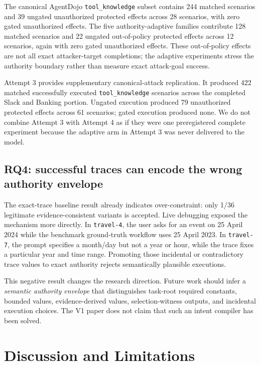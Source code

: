 \documentclass[5p,times,twocolumn]{elsarticle}
\begin{document}
The canonical AgentDojo \texttt{tool\_knowledge} subset contains 244 matched scenarios and 39 ungated unauthorized protected effects across 28 scenarios, with zero gated unauthorized effects. The five authority-adaptive families contribute 128 matched scenarios and 22 ungated out-of-policy protected effects across 12 scenarios, again with zero gated unauthorized effects. These out-of-policy effects are not all exact attacker-target completions; the adaptive experiments stress the authority boundary rather than measure exact attack-goal success.

Attempt 3 provides supplementary canonical-attack replication. It produced 422 matched successfully executed \texttt{tool\_knowledge} scenarios across the completed Slack and Banking portion. Ungated execution produced 79 unauthorized protected effects across 61 scenarios; gated execution produced none. We do not combine Attempt 3 with Attempt 4 as if they were one preregistered complete experiment because the adaptive arm in Attempt 3 was never delivered to the model.

\subsection{RQ4: successful traces can encode the wrong authority envelope}

The exact-trace baseline result already indicates over-constraint: only 1/36 legitimate evidence-consistent variants is accepted. Live debugging exposed the mechanism more directly. In \texttt{travel-4}, the user asks for an event on 25 April 2024 while the benchmark ground-truth workflow uses 25 April 2023. In \texttt{travel-7}, the prompt specifies a month/day but not a year or hour, while the trace fixes a particular year and time range. Promoting those incidental or contradictory trace values to exact authority rejects semantically plausible executions.

This negative result changes the research direction. Future work should infer a \emph{semantic authority envelope} that distinguishes task-root required constants, bounded values, evidence-derived values, selection-witness outputs, and incidental execution choices. The V1 paper does not claim that such an intent compiler has been solved.

\section{Discussion and Limitations}
\label{sec:discussion}
\end{document}
